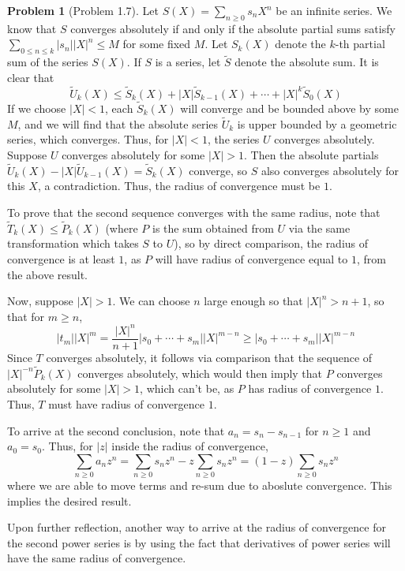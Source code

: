 \documentclass[aps,pra,showpacs,notitlepage,onecolumn,superscriptaddress,nofootinbib]{revtex4-1}
\theoremstyle{definition}
\newtheorem{problem}{Problem}[section]
\begin{document}
\begin{problem}[Problem 1.7]
  Let $S(X) = \sum_{n \geq 0} s_n X^n$ be an infinite series. We know that $S$ converges absolutely if and only if the absolute partial sums satisfy $\sum_{0 \leq n \leq k} |s_n| |X|^n \leq M$
  for some fixed $M$.
  Let $S_k(X)$ denote the $k$-th partial sum of the series $S(X)$. If $S$ is a series, let $\widetilde{S}$ denote the absolute sum. It is clear that
  \begin{equation}
    \widetilde{U}_k(X) \leq \widetilde{S}_k(X) + |X| \widetilde{S}_{k - 1}(X) + \cdots + |X|^{k} \widetilde{S}_0(X)
  \end{equation}
  If we choose $|X| < 1$, each $\widetilde{S}_k(X)$ will converge and be bounded above by some $M$, and we will find that the absolute series $\widetilde{U}_k$
  is upper bounded by a geometric series, which converges. Thus, for $|X| < 1$, the series $U$ converges absolutely. Suppose $U$ converges absolutely for some $|X| > 1$.
  Then the absolute partials $\widetilde{U}_k(X) - |X| \widetilde{U}_{k - 1}(X) = \widetilde{S}_k(X)$ converge, so $S$ also converges absolutely for this $X$, a contradiction.
  Thus, the radius of convergence must be $1$.

  To prove that the second sequence converges with the same radius, note that $\widetilde{T}_k(X) \leq \widetilde{P}_k(X)$ (where $P$ is the sum obtained from $U$ via the same transformation
  which takes $S$ to $U$), so by direct comparison, the radius of convergence is
  at least $1$, as $P$ will have radius of convergence equal to $1$, from the above result.

  Now, suppose $|X| > 1$. We can choose $n$ large enough so that $|X|^n > n + 1$, so that for $m \geq n$,
  \begin{equation}
    |t_m| |X|^{m} = \frac{|X|^n}{n + 1} |s_0 + \cdots + s_m| |X|^{m - n} \geq |s_0 + \cdots + s_m| |X|^{m - n}
    \end{equation}
  Since $T$ converges absolutely, it follows via comparison that the sequence of $|X|^{-n} \widetilde{P}_k(X)$ converges absolutely, which would then imply
  that $P$ converges absolutely for some $|X| > 1$, which can't be, as $P$ has radius of convergence $1$. Thus, $T$ must have radius of convergence $1$.
  \newline

  To arrive at the second conclusion, note that $a_n = s_n - s_{n - 1}$ for $n \geq 1$ and $a_0 = s_0$. Thus, for $|z|$ inside the radius of convergence,
  \begin{equation}
    \displaystyle\sum_{n \geq 0} a_n z^n = \displaystyle\sum_{n \geq 0} s_n z^n - z \displaystyle\sum_{n \geq 0} s_{n} z^{n} = (1 - z) \displaystyle\sum_{n \geq 0} s_n z^n
  \end{equation}
  where we are able to move terms and re-sum due to aboslute convergence. This implies the desired result.
  \newline

  \noindent Upon further reflection, another way to arrive at the radius of convergence for the second power series is by using the fact that derivatives
  of power series will have the same radius of convergence.
\end{problem}
\end{document}

